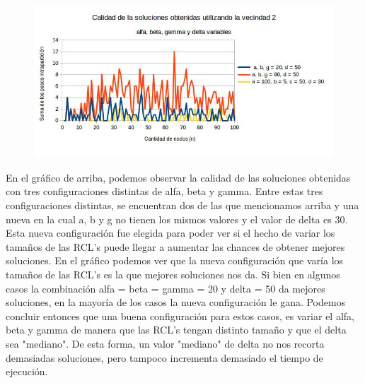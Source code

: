 \documentclass[a4paper]{article}
\begin{document}
\begin{figure}[H]
\centering 
\includegraphics[scale=0.7]{vecindad2variaabgd.jpg}
\end{figure}

En el gráfico de arriba, podemos observar la calidad de las soluciones obtenidas con tres configuraciones distintas de alfa, beta y gamma. Entre estas tres configuraciones distintas, se encuentran dos de las que mencionamos arriba y una nueva en la cual a, b y g no tienen los mismos valores y el valor de delta es 30. Esta nueva configuración fue elegida para poder ver si el hecho de variar los tamaños de las RCL's puede llegar a aumentar las chances de obtener mejores soluciones.
\newline En el gráfico podemos ver que la nueva configuración que varía los tamaños de las RCL's es la que mejores soluciones nos da. Si bien en algunos casos la combinación alfa = beta = gamma = 20 y delta = 50 da mejores soluciones, en la mayoría de los casos la nueva configuración le gana.
\newline Podemos concluir entonces que una buena configuración para estos casos, es variar el alfa, beta y gamma de manera que las RCL's tengan distinto tamaño y que el delta sea "mediano". De esta forma, un valor "mediano" de delta no nos recorta demasiadas soluciones, pero tampoco incrementa demasiado el tiempo de ejecución.
\end{document}
